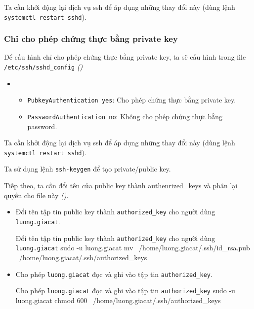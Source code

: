 Ta cần khởi động lại dịch vụ ssh để áp dụng những thay đổi này (dùng lệnh \texttt{systemctl restart sshd}).

\subsubsection{Chỉ cho phép chứng thực bằng private key}

Để cấu hình chỉ cho phép chứng thực bằng private key, ta sẽ cấu hình trong file \texttt{/etc/ssh/sshd\_config} \textit{()}


\begin{itemize}[label={}]
  \item
        \begin{itemize}[label={--}]
          \item \texttt{PubkeyAuthentication yes}: Cho phép chứng thực bằng private key.
          \item \texttt{PasswordAuthentication no}: Không cho phép chứng thực bằng password.
        \end{itemize}
\end{itemize}

Ta cần khởi động lại dịch vụ ssh để áp dụng những thay đổi này (dùng lệnh \texttt{systemctl restart sshd}).

Ta sử dụng lệnh \texttt{ssh-keygen} để tạo private/public key.


Tiếp theo, ta cần đổi tên của public key thành authenrized\_keys và phân lại quyền
cho file này \textit{()}.




\begin{itemize}[label={--}]
  \item Đổi tên tập tin public key thành \texttt{authorized\_key} cho người dùng \texttt{luong.giacat}.\\
        \begin{coding}[gobble=10]{Đổi tên tập tin public key thành \texttt{authorized\_key} cho người dùng \texttt{luong.giacat}}
          sudo -u luong.giacat mv \ /home/luong.giacat/.ssh/id_rsa.pub \ /home/luong.giacat/.ssh/authorized_keys
        \end{coding}

  \item Cho phép \texttt{luong.giacat} đọc và ghi vào tập tin \texttt{authorized\_key}.\\
        \begin{coding}[gobble=10]{Cho phép \texttt{luong.giacat} đọc và ghi vào tập tin \texttt{authorized\_key}}
          sudo -u luong.giacat chmod 600 \ /home/luong.giacat/.ssh/authorized_keys
        \end{coding}
\end{itemize}



